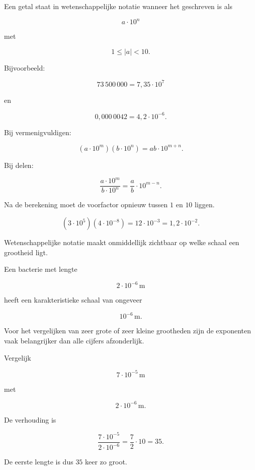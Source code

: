 \documentclass{ximera}
\begin{document}

Een getal staat in wetenschappelijke notatie wanneer het geschreven is als

\[
a\cdot10^n
\]

met

\[
1\leq |a|<10.
\]

Bijvoorbeeld:

\[
73\,500\,000
=
7{,}35\cdot10^7
\]

en

\[
0{,}000\,0042
=
4{,}2\cdot10^{-6}.
\]



Bij vermenigvuldigen:

\[
(a\cdot10^m)(b\cdot10^n)
=
ab\cdot10^{m+n}.
\]

Bij delen:

\[
\frac{a\cdot10^m}{b\cdot10^n}
=
\frac ab\cdot10^{m-n}.
\]

Na de berekening moet de voorfactor opnieuw tussen \(1\) en \(10\) liggen.

\begin{voorbeeld}
\[
(3\cdot10^5)(4\cdot10^{-8})
=
12\cdot10^{-3}
=
1{,}2\cdot10^{-2}.
\]
\end{voorbeeld}



Wetenschappelijke notatie maakt onmiddellijk zichtbaar op welke schaal een grootheid ligt.

Een bacterie met lengte

\[
2\cdot10^{-6}\,\mathrm m
\]

heeft een karakteristieke schaal van ongeveer

\[
10^{-6}\,\mathrm m.
\]

Voor het vergelijken van zeer grote of zeer kleine grootheden zijn de exponenten vaak
belangrijker dan alle cijfers afzonderlijk.

\begin{voorbeeld}
Vergelijk

\[
7\cdot10^{-5}\,\mathrm m
\]

met

\[
2\cdot10^{-6}\,\mathrm m.
\]

De verhouding is

\[
\frac{7\cdot10^{-5}}{2\cdot10^{-6}}
=
\frac72\cdot10
=
35.
\]

De eerste lengte is dus \(35\) keer zo groot.
\end{voorbeeld}
\end{document}
